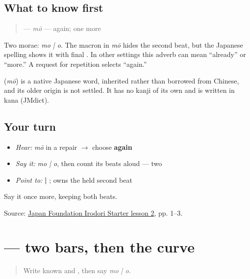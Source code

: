 \subsection*{What to know first}
\begin{quote}
\textbf{} — \emph{mō} — again; one more
\end{quote}

Two morae: \emph{mo | o}. The macron in \emph{mō} hides the second beat, but the Japanese spelling shows it with final \textbf{}. In other settings this adverb can mean “already” or “more.” A request for repetition selects “again.”

\begin{cousinweb}
\textbf{} (\emph{mō}) is a native Japanese word, inherited rather than borrowed from Chinese, and its older origin is not settled. It has no kanji of its own and is written in kana (JMdict).
\end{cousinweb}

\subsection*{Your turn}
\begin{itemize}
\raggedright
  \item \emph{Hear:} \emph{mō} in a repair $\to$ choose \textbf{again}
  \item \emph{Say it:} \emph{mo | o}, then count its beats aloud — two
  \item \emph{Point to:} \textbf{ | }; \textbf{} owns the held second beat
\end{itemize}

\begin{tcolorbox}[breakable,colback=teal!4,colframe=teal!35!black,title={Before you move on}]
Say it once more, keeping both beats.

Source: \href{https://www.irodori.jpf.go.jp/assets/data/starter/pdf/X\_L02.pdf}{Japan Foundation Irodori Starter lesson 2}, pp. 1–3.
\end{tcolorbox}
\section[\texorpdfstring{\ja{も} (mo)}{も (mo)}]{ — two bars, then the curve}

\label{lesson:JA-W09-mo}



\begin{quote}
Write known \textbf{} and \textbf{}, then say \emph{mo | o}.
\end{quote}

